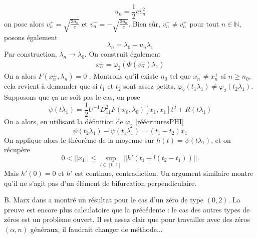 \documentclass[memoire.tex]{subfiles}
\begin{document}
\begin{preuve}
    \begin{equation*}
        u_n=\frac{1}{2}cv^2_n
    \end{equation*}
    on pose alors $v^{+}_n=\sqrt{\frac{2u_n}{c}}$ et $v^{-}_n=-\sqrt{\frac{2u_n}{c}}$. Bien sûr, $v^{-}_n\neq v^{+}_n $ pour tout $n\in\mathbb{N}$, posons également 
    \begin{equation*}
        \lambda_n = \lambda_0 -u_n\lambda_1
    \end{equation*}
    Par construction, $\lambda_n\rightarrow \lambda_0$.
    On construit également
    \begin{align*}
        x_n^{\pm}=\varphi_2(\Phi(v^\pm_n)\lambda_1)
    \end{align*}
    On a alors $F(x_n^\pm,\lambda_n)=0$ . Montrons qu'il existe $n_0$ tel que $x_n^-\neq x_n^+$ si $n\geq n_0$, cela revient à demander que si $t_1$ et $t_2$ sont assez petits, $\varphi_2(t_1\lambda_1)\neq\varphi_2(t_2\lambda_1)$. Supposons que ça ne soit pas le cas, on pose
    \begin{equation*}
        \psi(t\lambda_1)=\frac{1}{2}U^{-1}D^2_{11}F(x_0,\lambda_0)[x_1,x_1]t^2+R(t\lambda_1)
    \end{equation*}
    On a alors, en utilisant la définition de $\varphi_2$ \eqref{réécrituresPHI}
    \begin{equation*}
        \psi(t_2\lambda_1)-\psi(t_1\lambda_1)=(t_1-t_2)x_1
    \end{equation*}
    On applique alors le théorème de la moyenne sur $h(t)=\psi(t\lambda_1)$, et on récupère
    \begin{equation*}
        0<||x_1||\leq \sup_{l\in [0,1]} ||h'(t_1+l(t_2-t_1))||.     
    \end{equation*}
    Mais $h'(0)=0$ et $h'$ est continue, contradiction. Un argument similaire montre qu'il ne s'agit pas d'un élément de bifurcation perpendiculaire.
\end{preuve}
\begin{remarque}
    B. Marx dans \cite{Marx1994Bifurcation} a montré un résultat pour le cas d'un zéro de type $(0,2)$. La preuve est encore plus calculatoire que la précédente : le cas des autres types de zéros est un problème ouvert. Il est assez clair que pour travailler avec des zéros $(\alpha,n)$ généraux, il faudrait changer de méthode... 
\end{remarque}
\newpage
\end{document}

